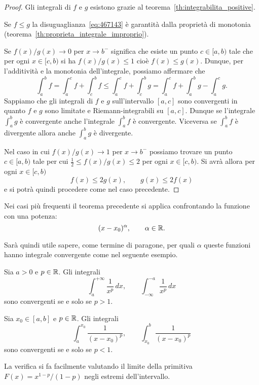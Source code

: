 \begin{proof}
\mymark{**}
Gli integrali di $f$ e $g$ esistono grazie al teorema~\ref{th:integrabilita_positive}.

Se $f\le g$ la disuguaglianza~\eqref{eq:467143} è garantità dalla proprietà di monotonia
(teorema~\ref{th:proprieta_integrale_improprio}).

Se $f(x)/g(x) \to 0$ per $x\to b^-$ significa che esiste un punto $c\in[a,b)$
tale che per ogni $x\in [c,b)$ si ha $f(x)/g(x)\le 1$ cioè $f(x)\le g(x)$.
Dunque, per l'additività e la monotonia dell'integrale, possiamo affermare che
\[
  \int_a^b f
  = \int_a^c f + \int_c^b f
  \le \int_a^c f + \int_c^b g
  = \int_a^c f + \int_a^b g - \int_a^c g.
\]
Sappiamo che gli integrali di $f$ e $g$ sull'intervallo
$[a,c]$ sono convergenti in quanto $f$ e $g$ sono
limitate e Riemann-integrabili su $[a,c]$.
Dunque se l'integrale $\int_a^b g$ è convergente anche l'integrale
$\int_a^b f$ è convergente.
Viceversa se $\int_a^b f$ è divergente allora anche $\int_a^b g$ è divergente.

Nel caso in cui $f(x)/g(x)\to 1$ per $x\to b^-$ possiamo trovare
un punto $c\in[a,b)$ tale per cui $\frac 1 2 \le f(x)/g(x) \le 2$
per ogni $x\in [c,b)$. Si avrà allora per ogni $x\in [c,b)$
\[
f(x) \le 2g(x), \qquad g(x) \le 2 f(x)
\]
e si potrà quindi procedere come nel caso precedente.
\end{proof}

Nei casi più frequenti il teorema precedente si applica confrontando la funzione con una potenza:
\[
  (x-x_0)^\alpha, \qquad \alpha \in \mathbb R.
\]

Sarà quindi utile sapere, come termine di paragone,
per quali $\alpha$ queste funzioni hanno integrale convergente
come nel seguente esempio.

\begin{example}
\label{ex:416145}%
\mymark{***}%
Sia $a>0$ e $p\in \mathbb R$. Gli integrali
\[
  \int_{a}^{+\infty}\frac{1}{x^p}\, dx,
  \qquad
  \int_{-\infty}^{-a}\frac{1}{x^p}\, dx
\]
sono convergenti se e solo se $p>1$.

Sia $x_0\in [a,b]$ e $p\in\mathbb R$.
Gli integrali
\[
  \int_a^{x_0} \frac{1}{(x-x_0)^p},
  \qquad
  \int_{x_0}^b \frac{1}{(x-x_0)^p}
\]
sono convergenti se e solo se $p<1$.

La verifica si fa facilmente valutando il limite della primitiva
$F(x) = x^{1-p}/(1-p)$ negli estremi dell'intervallo.
\end{example}

